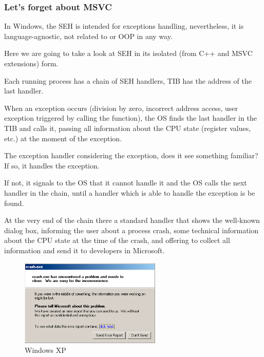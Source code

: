 \subsubsection{Let's forget about MSVC}

In Windows, the \ac{SEH} is intended for exceptions handling, nevertheless, it is language-agnostic,
not related to \Cpp or \ac{OOP} in any way.

Here we are going to take a look at \ac{SEH} in its isolated (from C++ and MSVC extensions) form.


Each running process has a chain of \ac{SEH} handlers, \ac{TIB} has the address of the last handler.

When an exception occurs (division by zero, incorrect address access, user exception triggered by
calling the  function), the \ac{OS} finds the last handler in the \ac{TIB} and calls it,
passing all information about the \ac{CPU} state (register values, etc.) at the moment of the exception.

The exception handler considering the exception, does it see something familiar?
If so, it handles the exception.

If not, it signals to the \ac{OS} that it
cannot handle it and the \ac{OS} calls the next handler in the chain,
until a handler which is able to handle the exception is be found.

At the very end of the chain there a standard handler that shows the well-known dialog box, informing the user about a
process crash, some technical information about the \ac{CPU} state at the time of the crash,
and offering to collect all information and send it to developers in Microsoft. 

\begin{figure}[H]
\centering
\includegraphics[width=0.6\textwidth]{OS/SEH/1/crash_xp1.png}
\caption{Windows XP}
\end{figure}

